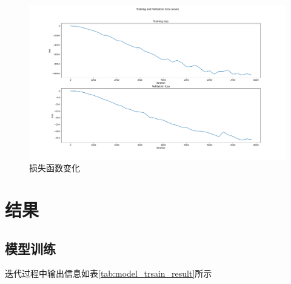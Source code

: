 \documentclass[hyperref,a4paper,UTF8]{ctexart}
\begin{document}
\begin{figure}[ht]
    \centering
    \includegraphics[width=1.0\textwidth]{fig/loss.png}
    \caption{损失函数变化}
    \label{fig:loss}
\end{figure}

\section{结果}
\subsection{模型训练}

迭代过程中输出信息如表\ref{tab:model_trsain_result}所示
\end{document}
